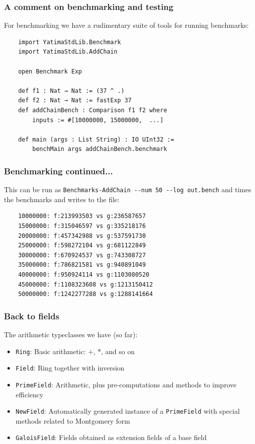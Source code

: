 \documentclass[options]{beamer}
\begin{document}
\begin{frame}[fragile]
    \frametitle{A comment on benchmarking and testing}

    For benchmarking we have a rudimentary suite of tools for running benchmarks:

    \begin{verbatim}
    import YatimaStdLib.Benchmark
    import YatimaStdLib.AddChain

    open Benchmark Exp

    def f1 : Nat → Nat := (37 ^ .)
    def f2 : Nat → Nat := fastExp 37
    def addChainBench : Comparison f1 f2 where
        inputs := #[10000000, 15000000,  ...]

    def main (args : List String) : IO UInt32 := 
        benchMain args addChainBench.benchmark
    \end{verbatim}

\end{frame}

\begin{frame}[fragile]
    \frametitle{Benchmarking continued...}

    This can be run as \verb+Benchmarks-AddChain --num 50 --log out.bench+
    and times the benchmarks and writes to the file:

    \begin{verbatim}
    10000000: f:213993503 vs g:236587657
    15000000: f:315046597 vs g:335218176
    20000000: f:457342988 vs g:537591730
    25000000: f:598272104 vs g:681122849
    30000000: f:670924537 vs g:743308727
    35000000: f:786821581 vs g:940891049
    40000000: f:950924114 vs g:1103080520
    45000000: f:1108323608 vs g:1213150412
    50000000: f:1242277288 vs g:1288141664
    \end{verbatim}

\end{frame}

\begin{frame}[fragile]
    \frametitle{Back to fields}

    The arithmetic typeclasses we have (so far):

    \begin{itemize}
        \item \verb+Ring+: Basic arithmetic: $+$, $*$, and so on
        \item \verb+Field+: Ring together with inversion
        \item \verb+PrimeField+: Arithmetic, plus pre-computations and methods to improve efficiency
        \item \verb+NewField+: Automatically generated instance of a \verb+PrimeField+ with special methods related to Montgomery form
        \item \verb+GaloisField+: Fields obtained as extension fields of a base field
    \end{itemize}

\end{frame}
\end{document}
